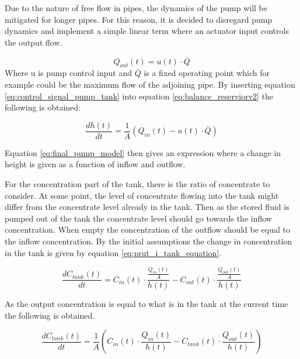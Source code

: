 Due to the nature of free flow in pipes, the dynamics of the pump will be mitigated for longer pipes. For this reason, it is decided to disregard pump dynamics and implement a simple linear term where an actuator input controls the output flow.

\begin{equation} \label{eq:control_signal_pump_tank}
    Q_{out}(t) = u(t) \cdot \overline Q
\end{equation}
Where u is pump control input and $\overline Q$ is a fixed operating point which for example could be the maximum flow of the adjoining pipe. By inserting equation \ref{eq:control_signal_pump_tank} into equation \ref{eq:balance_reserviorv2} the following is obtained:

\begin{equation}\label{eq:final_pump_model}
 \boxed{     \frac{dh(t)}{dt}=\frac{1}{A} \left(Q_{in}(t)-u(t) \cdot \overline Q \right) }
\end{equation}

Equation \ref{eq:final_pump_model} then gives an expression where a change in height is given as a function of inflow and outflow. 

For the concentration part of the tank, there is the ratio of concentrate to consider. At some point, the level of concentrate flowing into the tank might differ from the concentrate level already in the tank. Then as the stored fluid is pumped out of the tank the concentrate level should go towards the inflow concentration. When empty the concentration of the outflow should be equal to the inflow concentration. By the initial assumptions the change in concentration in the tank is given by equation \ref{eq:prut_i_tank_equation}.

\begin{equation} \label{eq:prut_i_tank_equation}
    \frac{dC_{tank}(t)}{dt} = C_{in}(t) \cdot \frac{\frac{Q_{in}(t)}{A}}{h(t)} - C_{out}(t) \cdot \frac{\frac{Q_{out}(t)}{A}}{h(t)}   
\end{equation}

As the output concentration is equal to what is in the tank at the current time the following is obtained.

\begin{equation} \label{eq:prut_i_tank_equation2}
\boxed{    \frac{dC_{tank}(t)}{dt} = \frac{1}{A} \left(C_{in}(t) \cdot \frac{Q_{in}(t)}{h(t)} - C_{tank}(t) \cdot \frac{Q_{out}(t)}{h(t)} \right) }   
\end{equation}

